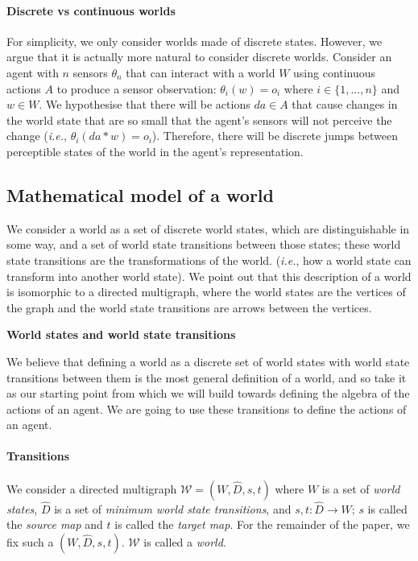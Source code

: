 \paragraph{Discrete vs continuous worlds}
For simplicity, we only consider worlds made of discrete states.
However, we argue that it is actually more natural to consider discrete worlds.
Consider an agent with $n$ sensors $\theta_{n}$ that can interact with a world $W$ using continuous actions $A$ to produce a sensor observation: $\theta_{i}(w) = o_{i}$ where $i \in \{1, ..., n\}$ and $w \in W$.
We hypothesise that there will be actions $da \in A$ that cause changes in the world state that are so small that the agent's sensors will not perceive the change (\textit{i.e.}, $\theta_{i}(da * w) = o_i$).
Therefore, there will be discrete jumps between perceptible states of the world in the agent's representation.

\subsection{Mathematical model of a world}

We consider a world as a set of discrete world states, which are distinguishable in some way, and a set of world state transitions between those states; these world state transitions are the transformations of the world. (\textit{i.e.}, how a world state can transform into another world state).
We point out that this description of a world is isomorphic to a directed multigraph, where the world states are the vertices of the graph and the world state transitions are arrows between the vertices.

\textbf{World states and world state transitions}

We believe that defining a world as a discrete set of world states with world state transitions between them is the most general definition of a world, and so take it as our starting point from which we will build towards defining the algebra of the actions of an agent.
We are going to use these transitions to define the actions of an agent.

\paragraph{Transitions}
We consider a directed multigraph $\mathscr{W} = (W, \hat{D}, s, t)$ where $W$ is a set of \textit{world states}, $\hat{D}$ is a set of \textit{minimum world state transitions}, and $s,t: \hat{D} \to W$; $s$ is called the \textit{source map} and $t$ is called the \textit{target map}.
For the remainder of the paper, we fix such a $(W, \hat{D}, s, t)$.
$\mathscr{W}$ is called a \textit{world}.

